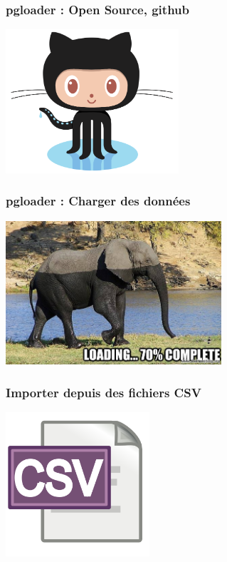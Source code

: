 \documentclass{beamer}
\begin{document}
\begin{frame}
  \frametitle{pgloader : Open Source, github}


  \begin{center}
    \includegraphics[height=2.1in]{Octocat.png}
  \end{center}
\end{frame}

\begin{frame}
  \frametitle{pgloader : Charger des données}


  \begin{center}
    \includegraphics[height=2.1in]{elephant-loading.jpg}
  \end{center}
\end{frame}

\begin{frame}
  \frametitle{Importer depuis des fichiers CSV}


  \begin{center}
    \includegraphics[height=2.1in]{csv_text.png}
  \end{center}
\end{frame}
\end{document}
